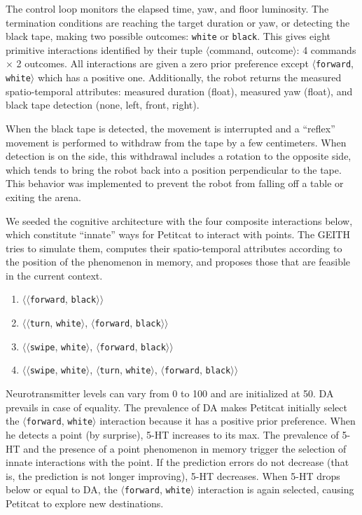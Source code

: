\documentclass[runningheads]{llncs}
\begin{document}
The control loop monitors the elapsed time, yaw, and floor luminosity. %
The termination conditions are reaching the target duration or yaw, or detecting the black tape, making two possible outcomes: \texttt{white} or \texttt{black}.
This gives eight primitive interactions identified by their tuple $\langle$command, outcome$\rangle$: 4 commands $\times$ 2 outcomes.
All interactions are given a zero prior preference except $\langle$\texttt{forward}, \texttt{white}$\rangle$ which has a positive one.
Additionally, the robot returns the measured spatio-temporal attributes: measured duration (float), measured yaw (float), and black tape detection (none, left, front, right). 

When the black tape is detected, the movement is interrupted and a ``reflex'' movement is performed to withdraw from the tape by a few centimeters. 
When detection is on the side, this withdrawal includes a rotation to the opposite side, which tends to bring the robot back into a position perpendicular to the tape. This behavior was implemented to prevent the robot from falling off a table or exiting the arena.

We seeded the cognitive architecture with the four composite interactions below, which constitute ``innate'' ways for Petitcat to interact with points. 
The GEITH tries to simulate them, computes their spatio-temporal attributes according to the position of the phenomenon in memory, and proposes those that are feasible in the current context.
\begin{enumerate}
	\item $\langle\langle$\texttt{forward}, \texttt{black}$\rangle\rangle$
	\item $\langle\langle$\texttt{turn}, \texttt{white}$\rangle$, $\langle$\texttt{forward}, \texttt{black}$\rangle\rangle$
	\item $\langle\langle$\texttt{swipe}, \texttt{white}$\rangle$, $\langle$\texttt{forward}, \texttt{black}$\rangle\rangle$
	\item $\langle\langle$\texttt{swipe}, \texttt{white}$\rangle$, $\langle$\texttt{turn}, \texttt{white}$\rangle$, $\langle$\texttt{forward}, \texttt{black}$\rangle\rangle$
\end{enumerate}

Neurotransmitter levels can vary from 0 to 100 and are initialized at 50. DA prevails in case of equality.
The prevalence of DA makes Petitcat initially select the $\langle$\texttt{forward}, \texttt{white}$\rangle$ interaction because it has a positive prior preference.
When he detects a point (by surprise), 5-HT increases to its max. 
The prevalence of 5-HT and the presence of a point phenomenon in memory trigger the selection of innate interactions with the point.
If the prediction errors do not decrease (that is, the prediction is not longer improving), 5-HT decreases.
When 5-HT drops below or equal to DA, the $\langle$\texttt{forward}, \texttt{white}$\rangle$ interaction is again selected, causing Petitcat to explore new destinations. 
\end{document}

